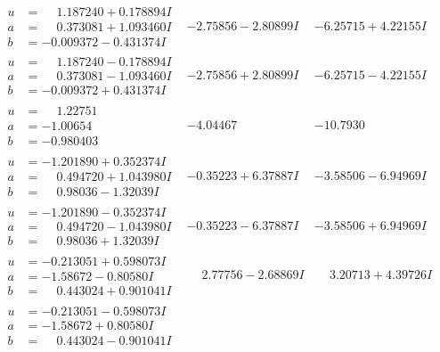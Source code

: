 \documentclass[1p]{elsarticle_modified}
\theoremstyle{definition}
\begin{document}
$$\begin{array}{c|c|c}
\begin{aligned}
u &= \phantom{-}1.187240 + 0.178894 I \\
a &= \phantom{-}0.373081 + 1.093460 I \\
b &= -0.009372 - 0.431374 I\end{aligned}
 & -2.75856 - 2.80899 I & -6.25715 + 4.22155 I \\ \hline\begin{aligned}
u &= \phantom{-}1.187240 - 0.178894 I \\
a &= \phantom{-}0.373081 - 1.093460 I \\
b &= -0.009372 + 0.431374 I\end{aligned}
 & -2.75856 + 2.80899 I & -6.25715 - 4.22155 I \\ \hline\begin{aligned}
u &= \phantom{-}1.22751\phantom{ +0.000000I} \\
a &= -1.00654\phantom{ +0.000000I} \\
b &= -0.980403\phantom{ +0.000000I}\end{aligned}
 & -4.04467\phantom{ +0.000000I} & -10.7930\phantom{ +0.000000I} \\ \hline\begin{aligned}
u &= -1.201890 + 0.352374 I \\
a &= \phantom{-}0.494720 + 1.043980 I \\
b &= \phantom{-}0.98036 - 1.32039 I\end{aligned}
 & -0.35223 + 6.37887 I & -3.58506 - 6.94969 I \\ \hline\begin{aligned}
u &= -1.201890 - 0.352374 I \\
a &= \phantom{-}0.494720 - 1.043980 I \\
b &= \phantom{-}0.98036 + 1.32039 I\end{aligned}
 & -0.35223 - 6.37887 I & -3.58506 + 6.94969 I \\ \hline\begin{aligned}
u &= -0.213051 + 0.598073 I \\
a &= -1.58672 - 0.80580 I \\
b &= \phantom{-}0.443024 + 0.901041 I\end{aligned}
 & \phantom{-}2.77756 - 2.68869 I & \phantom{-}3.20713 + 4.39726 I \\ \hline\begin{aligned}
u &= -0.213051 - 0.598073 I \\
a &= -1.58672 + 0.80580 I \\
b &= \phantom{-}0.443024 - 0.901041 I\end{aligned}

\end{array}$$
\end{document}
